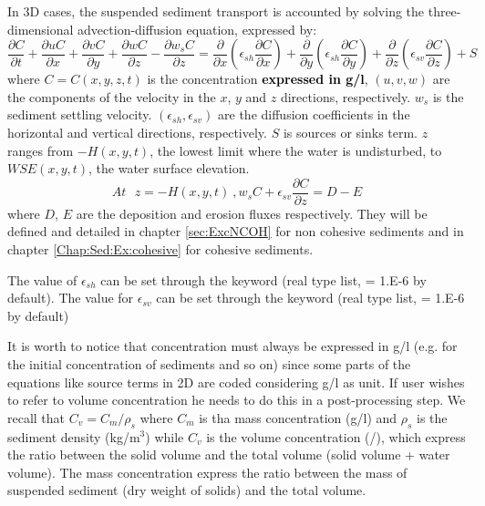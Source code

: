 In 3D cases, the suspended sediment transport is accounted by solving the three-dimensional advection-diffusion equation, expressed by:
\begin{equation}\label{eq:3DADE}
\frac{\partial C}{\partial t} + \frac{\partial uC}{\partial x} + \frac{\partial vC}{\partial y} + \frac{\partial wC}{\partial z} -\frac{\partial w_sC}{\partial z} =
\frac{\partial}{\partial x}\left(\epsilon_{sh}\frac{\partial C}{\partial x}\right) +
\frac{\partial}{\partial y}\left(\epsilon_{sh}\frac{\partial C}{\partial y}\right) +
\frac{\partial}{\partial z}\left(\epsilon_{sv}\frac{\partial C}{\partial z}\right) + S
\end{equation}
where $C=C(x,y,z,t)$ is the concentration \textcolor{black}{\bf expressed in g/l}, $(u,v,w)$ are the components of the velocity in the $x$, $y$ and $z$ directions, respectively. $w_s$ is the sediment settling velocity. $(\epsilon_{sh}, \epsilon_{sv})$ are the diffusion coefficients in the horizontal and vertical directions, respectively.
$S$ is sources or sinks term.
$z$ ranges from $-H(x,y,t)$, the lowest limit where the water is undisturbed,
 to $WSE(x,y,t)$, the water surface elevation.
\begin{equation*}\label{eq:at_mH}
At ~~~ z=-H(x,y,t)~, w_sC + \epsilon_{sv}\frac{\partial C}{\partial z} = D-E
\end{equation*}
where $D$, $E$ are the deposition and erosion fluxes respectively.
They will be defined and detailed in chapter \ref{sec:ExcNCOH} for non cohesive
sediments and in chapter \ref{Chap:Sed:Ex:cohesive} for cohesive sediments.

The value of $\epsilon_{sh}$ can be set through the keyword  (real type list, {\ttfamily = 1.E-6}
by default). The value for $\epsilon_{sv}$ can be set through the keyword
(real type list, {\ttfamily = 1.E-6} by default)

It is worth to notice that concentration must always be expressed in g/l
(e.g. for the initial concentration of sediments and so on) since some parts
of the equations like source terms
in 2D are coded considering g/l as unit. If user wishes to refer to volume
concentration he needs to do this in a post-processing step. We recall that
$C_v=C_m/\rho_s$ where $C_m$ is tha mass concentration (g/l) and $\rho_s$ is the
sediment density (kg/m$^3$) while $C_v$ is the
volume concentration (/), which express the ratio between the solid volume and
the total volume (solid volume + water volume). The mass concentration express
the ratio between the mass of suspended sediment (dry weight of solids) and the
total volume.

